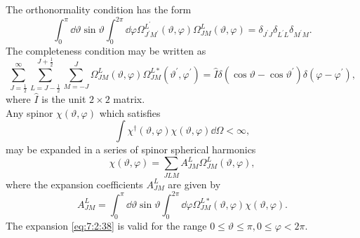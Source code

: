 The orthonormality condition has the form
\begin{equation}
\int_{0}^{\pi} \dd \vartheta \sin \vartheta \int_{0}^{2 \pi} \dd \varphi \Omega_{J^{\prime} M^{\prime}}^{L^{\prime}}(\vartheta, \varphi) \Omega_{J M}^{L}(\vartheta, \varphi)=\delta_{J^{\prime} J} \delta_{L^{\prime} L} \delta_{M^{\prime} M}. \label{eq:7:2:35}
\end{equation}
The completeness condition may be written as
\begin{equation}
\sum_{J=\frac{1}{2}}^{\infty} \sum_{L=J-\frac{1}{2}}^{J+\frac{1}{2}} \sum_{M=-J}^{J} \Omega_{J M}^{L}(\vartheta, \varphi) \Omega_{J M}^{L*}\left(\vartheta^{\prime}, \varphi^{\prime}\right)=\widehat{I} \delta\left(\cos \vartheta-\cos \vartheta^{\prime}\right) \delta\left(\varphi-\varphi^{\prime}\right), \label{eq:7:2:36}
\end{equation}
where $\widehat{I}$ is the unit $2 \times 2$ matrix.\\
Any spinor $\chi(\vartheta, \varphi)$ which satisfies
\begin{equation}
\int \chi^{\dagger}(\vartheta, \varphi) \chi(\vartheta, \varphi) \dd \Omega<\infty, \label{eq:7:2:37}
\end{equation}
may be expanded in a series of spinor spherical harmonics
\begin{equation}
\chi(\vartheta, \varphi)=\sum_{J L M} A_{J M}^{L} \Omega_{J M}^{L}(\vartheta, \varphi), \label{eq:7:2:38}
\end{equation}
where the expansion coefficients $A_{J M}^{L}$ are given by
\begin{equation}
A_{J M}^{L}=\int_{0}^{\pi} \dd \vartheta \sin \vartheta \int_{0}^{2 \pi} \dd \varphi \Omega_{J M}^{L*}(\vartheta, \varphi) \chi(\vartheta, \varphi). \label{eq:7:2:39}
\end{equation}
The expansion \eqref{eq:7:2:38} is valid for the range $0 \leq \vartheta \leq \pi, 0 \leq \varphi<2 \pi$.

